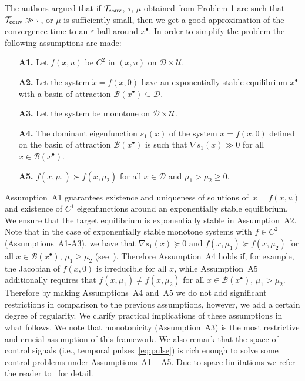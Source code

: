 \documentclass[letterpaper, 10pt, journal]{IEEEtran}  %
\newcommand{\cB}{{\mathcal B}}
\newcommand{\cD}{{\mathcal D}}
\newcommand{\cT}{{\mathcal T}}
\newcommand{\cU}{{\mathcal U}}
\begin{document}
The authors argued that if $\cT_{\rm conv}$, $\tau$, $\mu$ obtained from Problem 1 are such that $\cT_{\rm conv}\gg \tau$, or $\mu$ is sufficiently small, then we get a good approximation of the convergence time to an $\varepsilon$-ball around $x^\bullet$. In order to simplify the problem the following assumptions are made:
\begin{enumerate}
	\item[{\bf A1.}] Let $f(x,u)$ be $C^2$ in $(x,u)$ on $\cD\times \cU$.
	\item[{\bf A2.}] Let the system $\dot x = f(x, 0)$ have an exponentially stable equilibrium $x^\bullet$ with a basin of attraction $\cB(x^\bullet)\subseteq\cD$.
	\item[{\bf A3.}] Let the system be monotone on $\cD\times\cU$. 
	\item[{\bf A4.}] The dominant eigenfunction $s_1(x)$ of the system $\dot x = f(x,0)$ defined on the basin of attraction $\cB(x^\bullet)$ is such that  $\nabla s_1(x) \gg 0$ for all $x\in \cB(x^\bullet)$. 
	\item[{\bf A5.}] $f(x, \mu_1) \succ f(x, \mu_2)$ for all $x\in\cD$ and $\mu_1> \mu_2\ge 0$.
\end{enumerate}

Assumption~{A1} guarantees existence and uniqueness of solutions of~$\dot x =f(x, u)$ and existence of $C^1$ eigenfunctions around an exponentially stable equilibrium. We ensure that the target equilibrium is exponentially stable in Assumption~A2. Note that in the case of exponentially stable monotone systems with $f\in C^2$ (Assumptions~{A1}-{A3}), we have that $\nabla s_1(x) \succeq 0$ and $f(x, \mu_1) \succeq f(x, \mu_2)$ for all $x\in\cB(x^\bullet)$, $\mu_1 \ge \mu_2$ (see~\cite{angeli2003monotone}). Therefore Assumption~A4 holds if, for example, the Jacobian of $f(x, 0)$ is irreducible for all $x$, while Assumption~A5 additionally requires that $f(x, \mu_1) \ne f(x, \mu_2)$ for all $x\in\cB(x^\bullet)$, $\mu_1 > \mu_2$. Therefore by making Assumptions~A4 and~A5 we do not add significant restrictions in comparison to the previous assumptions, however, we add a certain degree of regularity. We clarify practical implications of these assumptions in what follows. We note that monotonicity (Assumption~A3) is the most restrictive and crucial assumption of this framework. We also remark that the space of control signals (i.e., temporal pulses~\eqref{eq:pulse}) is rich enough to solve some control problems under Assumptions~{A1 -- A5}. Due to space limitations we refer the reader to~\cite{sootla2016optimalswitching} for detail.
\end{document}
